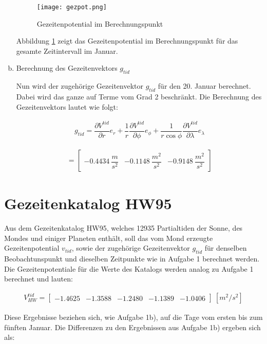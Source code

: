 \begin{enumerate}[a)]
\begin{figure}[H]
\centering
\texttt{[image: gezpot.png]}
\caption{Gezeitenpotential im Berechnungspunkt}
\label{gezpot}
\end{figure}

Abbildung \ref{gezpot} zeigt das Gezeitenpotential im Berechnungspunkt für das gesamte Zeitintervall im Januar. 

\item Berechnung des Gezeitenvektors $g_{tid}$

Nun wird der zugehörige Gezeitenvektor $g_{tid}$ für den 20. Januar berechnet. Dabei wird das ganze auf Terme vom Grad 2 beschränkt. Die Berechnung des Gezeitenvektors lautet wie folgt: 

\begin{gather}
g_{tid} = \dfrac{\partial V^{tid}}{\partial r} e_r + \dfrac{1}{r} \dfrac{\partial V^{tid}}{\partial \phi} e_{\phi} + \dfrac{1}{r \cos \phi} \dfrac{\partial V^{tid}}{\partial \lambda} e_{\lambda}
\end{gather}

\begin{gather*}
= \begin{bmatrix}
-0.4434 ~\dfrac{m}{s^2} &-0.1148 ~\dfrac{m^2}{s^2} &-0.9148 ~\dfrac{m^2}{s^2}
\end{bmatrix}
\end{gather*}
\end{enumerate}

\section{Gezeitenkatalog HW95}

Aus dem Gezeitenkatalog HW95, welches 12935 Partialtiden der Sonne, des Mondes und einiger Planeten enthält, soll das vom Mond erzeugte Gezeitenpotential $v_{tid}$, sowie der zugehörige Gezeitenvektor $g_{tid}$ für denselben Beobachtunspunkt und dieselben Zeitpunkte wie in Aufgabe 1 berechnet werden. Die Gezeitenpotentiale für die Werte des Katalogs werden analog zu Aufgabe 1 berechnet und lauten: 

\begin{gather}
V_{HW}^{tid} = \begin{bmatrix}
-1.4625 &-1.3588& -1.2480&-1.1389&-1.0406
\end{bmatrix}~[m^2/s^2]
\end{gather}

Diese Ergebnisse beziehen sich, wie Aufgabe 1b), auf die Tage vom ersten bis zum fünften Januar. Die Differenzen zu den Ergebnissen aus Aufgabe 1b) ergeben sich als: 

